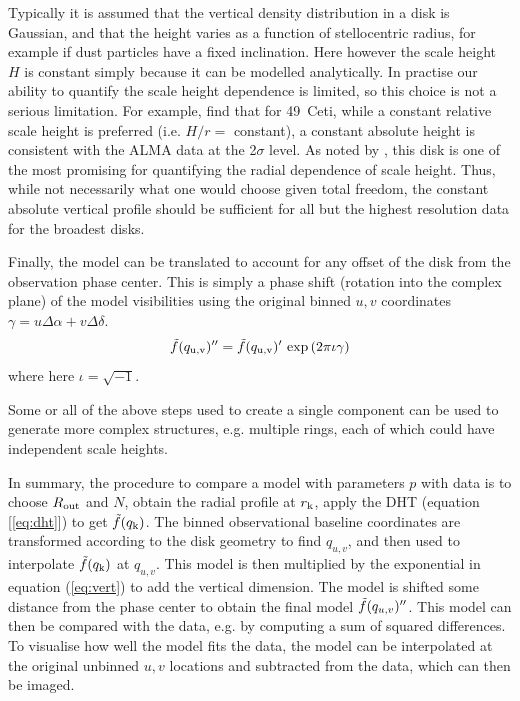\documentclass[fleqn,usenatbib]{mnras}
\begin{document}
Typically it is assumed that the vertical density distribution in a disk is Gaussian, and that the height varies as a function of stellocentric radius, for example if dust particles have a fixed inclination. Here however the scale height $H$ is constant simply because it can be modelled analytically. In practise our ability to quantify the scale height dependence is limited, so this choice is not a serious limitation. For example, \citet{2023MNRAS.524.1229T} find that for 49~Ceti, while a constant relative scale height is preferred (i.e. $H/r=$ constant), a constant absolute height is consistent with the ALMA data at the 2$\sigma$ level. As noted by \citet{2023MNRAS.524.1229T}, this disk is one of the most promising for quantifying the radial dependence of scale height. Thus, while not necessarily what one would choose given total freedom, the constant absolute vertical profile should be sufficient for all but the highest resolution data for the broadest disks.

Finally, the model can be translated to account for any offset of the disk from the observation phase center. This is simply a phase shift (rotation into the complex plane) of the model visibilities using the original binned $u,v$ coordinates $\gamma = u \Delta \alpha + v \Delta \delta$.
\begin{equation}\label{eq:phase}
    \Tilde{f}(q_{\rm u,v})'' = \Tilde{f}(q_{\rm u,v})' \, \exp{(2 \pi \iota \gamma)}
\end{equation}
where here $\iota = \sqrt{-1}$.

Some or all of the above steps used to create a single component can be used to generate more complex structures, e.g. multiple rings, each of which could have independent scale heights.

In summary, the procedure to compare a model with parameters $p$ with data is to choose $R_{\rm out}$ and $N$, obtain the radial profile at $r_{\rm k}$, apply the DHT (equation [\ref{eq:dht}]) to get $\Tilde{f}(q_{\rm k})$. The binned observational baseline coordinates are transformed according to the disk geometry to find $q_{u,v}$, and then used to interpolate $\Tilde{f}(q_{\rm k})$ at $q_{u,v}$. This model is then multiplied by the exponential in equation (\ref{eq:vert}) to add the vertical dimension. The model is shifted some distance from the phase center to obtain the final model $\Tilde{f}(q_{u,v})''$. This model can then be compared with the data, e.g. by computing a sum of squared differences. To visualise how well the model fits the data, the model can be interpolated at the original unbinned $u,v$ locations and subtracted from the data, which can then be imaged.
\end{document}
